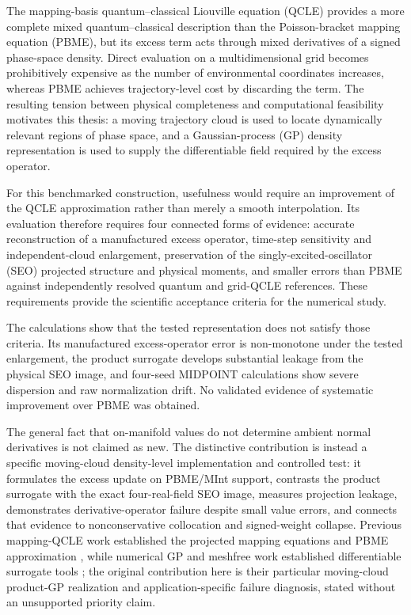 \documentclass[
  11pt,
  letterpaper,
  onehalfspacing,
  normalmargins,
  equalmargins,
  oneside
]{ut-thesis}
\begin{document}
The mapping-basis quantum--classical Liouville equation (QCLE) provides a more
complete mixed quantum--classical description than the Poisson-bracket mapping
equation (PBME), but its excess term acts through mixed derivatives of a signed
phase-space density. Direct evaluation on a multidimensional grid becomes
prohibitively expensive as the number of environmental coordinates increases,
whereas PBME achieves trajectory-level cost by discarding the term. The
resulting tension between physical completeness and computational feasibility
motivates this thesis: a moving trajectory cloud is used to locate dynamically
relevant regions of phase space, and a Gaussian-process (GP) density
representation is used to supply the differentiable field required by the
excess operator.

For this benchmarked construction, usefulness would require an improvement of
the QCLE approximation rather than merely a smooth interpolation. Its evaluation therefore
requires four connected forms of evidence: accurate reconstruction of a
manufactured excess operator, time-step sensitivity and independent-cloud
enlargement, preservation of the singly-excited-oscillator (SEO) projected
structure and physical moments, and smaller errors than PBME against
independently resolved quantum and grid-QCLE references. These requirements
provide the scientific acceptance criteria for the numerical study.

The calculations show that the tested representation does not satisfy those
criteria.  Its manufactured excess-operator error is non-monotone under the
tested enlargement, the product surrogate develops substantial leakage from
the physical SEO image, and four-seed MIDPOINT calculations show severe
dispersion and raw normalization drift.  No validated evidence of systematic
improvement over PBME was obtained.

The general fact that on-manifold values do not determine ambient normal
derivatives is not claimed as new.  The distinctive contribution is instead a
specific
moving-cloud density-level implementation and controlled test: it formulates
the excess update on PBME/MInt support, contrasts the product surrogate with
the exact four-real-field SEO image, measures projection leakage, demonstrates
derivative-operator failure despite small value errors, and connects that
evidence to nonconservative collocation and signed-weight collapse.  Previous
mapping-QCLE work established the projected mapping equations and PBME
approximation \cite{Kim2008JCP,Kelly2012JCP}, while numerical GP and meshfree
work established differentiable surrogate tools
\cite{Solak2002DerivativeGP,Raissi2017LinearGP,
CockayneOatesSullivanGirolami2019}; the original contribution here is their particular
moving-cloud product-GP realization and application-specific failure
diagnosis, stated without an unsupported priority claim.
\end{document}
